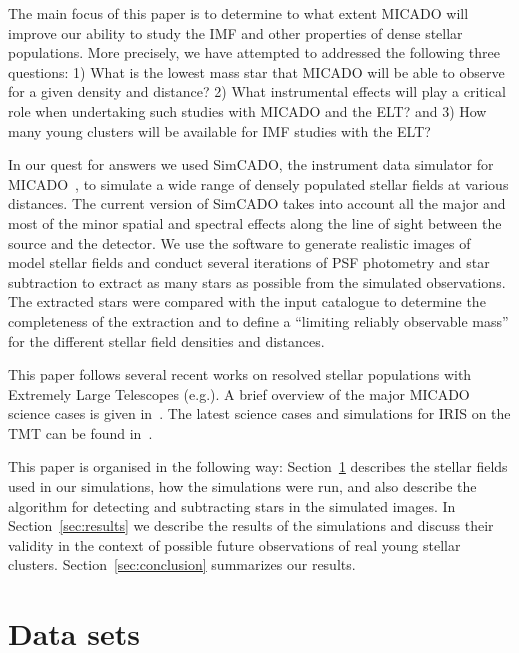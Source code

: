 \documentclass[referee]{aa}
\begin{document}
The main focus of this paper is to determine to what extent MICADO will improve our ability to study the IMF and other properties of dense stellar populations.
More precisely, we have attempted to addressed the following three questions:
1) What is the lowest mass star that MICADO will be able to observe for a given density and distance?
2) What instrumental effects will play a critical role when undertaking such studies with MICADO and the ELT? and
3) How many young clusters will be available for IMF studies with the ELT?

In our quest for answers we used SimCADO, the instrument data simulator for MICADO~\citep{leschinski2016, leschinski19}, to simulate a wide range of densely populated stellar fields at various distances.
The current version of SimCADO takes into account all the major and most of the minor spatial and spectral effects along the line of sight between the source and the detector.
We use the software to generate realistic images of model stellar fields and  conduct several iterations of PSF photometry and star subtraction to extract as many stars as possible from the simulated observations.
The extracted stars were compared with the input catalogue to determine the completeness of the extraction and to define a ``limiting reliably observable mass'' for the different stellar field densities and distances.

This paper follows several recent works on resolved stellar populations with Extremely Large Telescopes
(e.g.\~\citealt{deep11, greggio12, gullieuszik15, tolstoy19_iau}).
A brief overview of the major MICADO science cases is given in~\cite{micado2016}.
The latest science cases and simulations for IRIS on the TMT can be found in~\cite{tmt_iris16}.

This paper is organised in the following way: Section~\ref{sec:observations} describes the stellar fields used in our simulations, how the simulations were run, and also describe the algorithm for detecting and subtracting stars in the simulated images.
In Section~\ref{sec:results} we describe the results of the simulations and discuss their validity in the context of possible future observations of real young stellar clusters.
Section~\ref{sec:conclusion} summarizes our results.



\section{Data sets}
\label{sec:observations}
\end{document}
